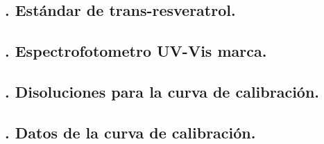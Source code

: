 \subsection*{\theanexo. Estándar de trans-resveratrol.}
\label{anexo:estandar}

\subsection*{\theanexo. Espectrofotometro UV-Vis marca.}
\label{anexo:espectro}

\subsection*{\theanexo. Disoluciones para la curva de calibración.}
\label{anexo:disoluciones}

\subsection*{\theanexo. Datos de la curva de calibración.}
\label{anexo:stats}



